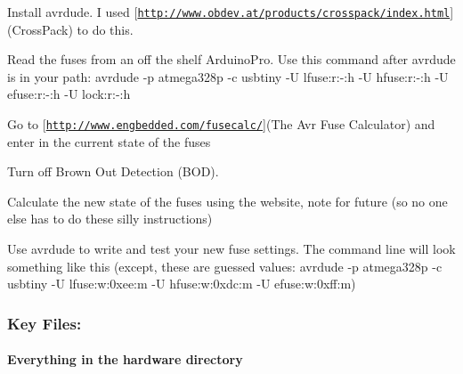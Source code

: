 \begin{DoxyEnumerate}
\item Install avrdude. I used \mbox{[}\href{http://www.obdev.at/products/crosspack/index.html}{\tt http\+://www.\+obdev.\+at/products/crosspack/index.\+html}\mbox{]}(Cross\+Pack) to do this.
\end{DoxyEnumerate}
\begin{DoxyEnumerate}
\item Read the fuses from an off the shelf Arduino\+Pro. Use this command after avrdude is in your path\+: {\ttfamily avrdude -\/p atmega328p -\/c usbtiny -\/\+U lfuse\+:r\+:-\/\+:h -\/\+U hfuse\+:r\+:-\/\+:h -\/\+U efuse\+:r\+:-\/\+:h -\/\+U lock\+:r\+:-\/\+:h}
\end{DoxyEnumerate}
\begin{DoxyEnumerate}
\item Go to \mbox{[}\href{http://www.engbedded.com/fusecalc/}{\tt http\+://www.\+engbedded.\+com/fusecalc/}\mbox{]}(The Avr Fuse Calculator) and enter in the current state of the fuses
\end{DoxyEnumerate}
\begin{DoxyEnumerate}
\item Turn off Brown Out Detection (B\+O\+D).
\end{DoxyEnumerate}
\begin{DoxyEnumerate}
\item Calculate the new state of the fuses using the website, note for future (so no one else has to do these silly instructions)
\end{DoxyEnumerate}
\begin{DoxyEnumerate}
\item Use avrdude to write and test your new fuse settings. The command line will look something like this (except, these are guessed values\+: {\ttfamily avrdude -\/p atmega328p -\/c usbtiny -\/\+U lfuse\+:w\+:0xee\+:m -\/\+U hfuse\+:w\+:0xdc\+:m -\/\+U efuse\+:w\+:0xff\+:m})
\end{DoxyEnumerate}

\subsubsection*{Key Files\+:}

\paragraph*{Everything in the {\ttfamily hardware} directory}

